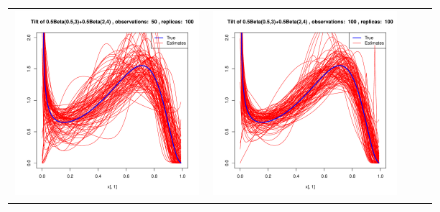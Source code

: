 \documentclass[10pt]{report}
\begin{document}
\begin{figure}[h]
\begin{tabular}{cccc}
	
	\includegraphics[width=\textwidth/4]{../img/p05_a05_b3_p05_a2_b4/tilted/K3/densities/n50_R100.pdf}
	&
	\includegraphics[width=\textwidth/4]{../img/p05_a05_b3_p05_a2_b4/tilted/K3/densities/n100_R100.pdf}

\end{tabular}
\end{figure}
\end{document}
